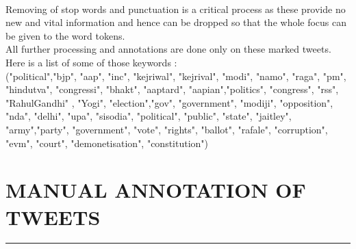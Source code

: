 \documentclass[a4paper,11pt]{article}
\begin{document}
\medskip\\
Removing of stop words and punctuation is a critical process as these provide no new and vital information and hence can be dropped so that the whole focus can be given to the word tokens.
\medskip\\
All further processing and annotations are done only on these marked tweets.
\medskip\\
Here is a list of some of those keywords : \medskip\\
("political","bjp", "aap", "inc", "kejriwal", "kejrival", "modi", "namo", "raga", "pm", "hindutva", "congressi", "bhakt", "aaptard", "aapian","politics", "congress", "rss", "RahulGandhi" , "Yogi", "election","gov", "government", "modiji", "opposition", "nda", "delhi", "upa", "sisodia", "political", "public", "state", "jaitley", "army","party", "government", "vote", "rights", "ballot", "rafale", "corruption", "evm", "court", "demonetisation", "constitution")


 
\newpage
\section{MANUAL ANNOTATION OF TWEETS}
\hrule
\vspace*{5mm}
\end{document}

